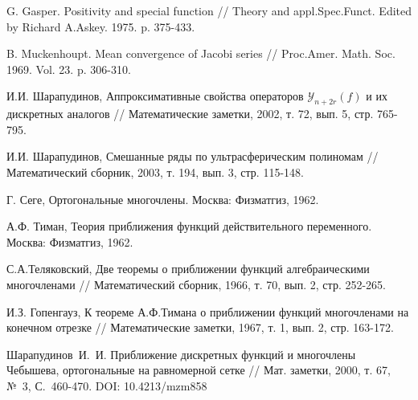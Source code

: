 \begin{thebibliography}{999}

 G. Gasper. Positivity and special function // Theory and appl.Spec.Funct. Edited by Richard A.Askey. 1975. p. 375-433.




 B. Muckenhoupt. Mean convergence of Jacobi series // Proc.Amer. Math. Soc. 1969. Vol. 23.  p. 306-310.






 И.И. Шарапудинов, Аппроксимативные свойства операторов $\mathcal{Y}_{n+2r}(f)$ и их дискретных аналогов // Математические заметки, 2002, т. 72, вып. 5, стр. 765-795.




 И.И. Шарапудинов, Смешанные ряды по ультрасферическим полиномам // Математический сборник, 2003, т. 194, вып. 3, стр. 115-148.







 Г. Сеге, Ортогональные многочлены. Москва: Физматгиз, 1962.




 А.Ф. Тиман, Теория приближения функций действительного переменного. Москва: Физматгиз, 1962.




 С.А.Теляковский, Две теоремы о приближении функций
алгебраическими многочленами // Математический сборник, 1966, т. 70, вып. 2, стр. 252-265.




 И.З. Гопенгауз, К теореме А.Ф.Тимана о приближении
функций многочленами на конечном отрезке // Математические заметки, 1967, т. 1, вып. 2, стр. 163-172.




 Шарапудинов~И.~И. Приближение дискретных функций и многочлены Чебышева, ортогональные на равномерной сетке // Мат. заметки, 2000, т. 67, №~3, С.~460-470. DOI: 10.4213/mzm858




\end{thebibliography}

